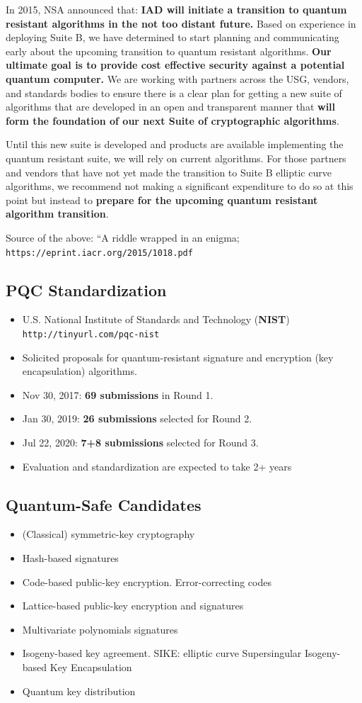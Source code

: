 \documentclass[12pt,titlepage]{article}
\begin{document}
In 2015, NSA announced that: \textbf{IAD will initiate a transition to quantum resistant algorithms in the not too distant future.} Based on experience in deploying Suite B, we have determined to start planning and communicating early about the upcoming transition to quantum resistant algorithms. \textbf{Our ultimate goal is to provide cost effective security against a potential quantum computer.} We are working with partners across the USG, vendors, and standards bodies to ensure there is a clear plan for getting a new suite of algorithms that are developed in an open and transparent manner that \textbf{will form the foundation of our next Suite of cryptographic algorithms}.

Until this new suite is developed and products are available implementing the quantum resistant suite, we will rely on current algorithms. For those partners and vendors that have not yet made the transition to Suite B elliptic curve algorithms, we recommend not making a significant expenditure to do so at this point but instead to \textbf{prepare for the upcoming quantum resistant algorithm transition}.

Source of the above: ``A riddle wrapped in an enigma; \texttt{https://eprint.iacr.org/2015/1018.pdf}
\subsection{PQC Standardization}
\begin{itemize}
	\item U.S. National Institute of Standards and Technology (\textbf{NIST}) \texttt{http://tinyurl.com/pqc-nist}
	\item Solicited proposals for quantum-resistant signature and encryption (key encapsulation) algorithms.
	\item Nov 30, 2017: \textbf{69 submissions} in Round 1.
	\item Jan 30, 2019: \textbf{26 submissions} selected for Round 2.
	\item Jul 22, 2020: \textbf{7+8 submissions} selected for Round 3.
	\item Evaluation and standardization are expected to take 2+ years
\end{itemize}
\subsection{Quantum-Safe Candidates}
\begin{itemize}
	\item (Classical) symmetric-key cryptography
	\item Hash-based signatures
	\item Code-based public-key encryption. Error-correcting codes
	\item Lattice-based public-key encryption and signatures
	\item Multivariate polynomials signatures
	\item Isogeny-based key agreement. SIKE: elliptic curve Supersingular Isogeny-based Key Encapsulation
	\item Quantum key distribution
\end{itemize}
\end{document}
